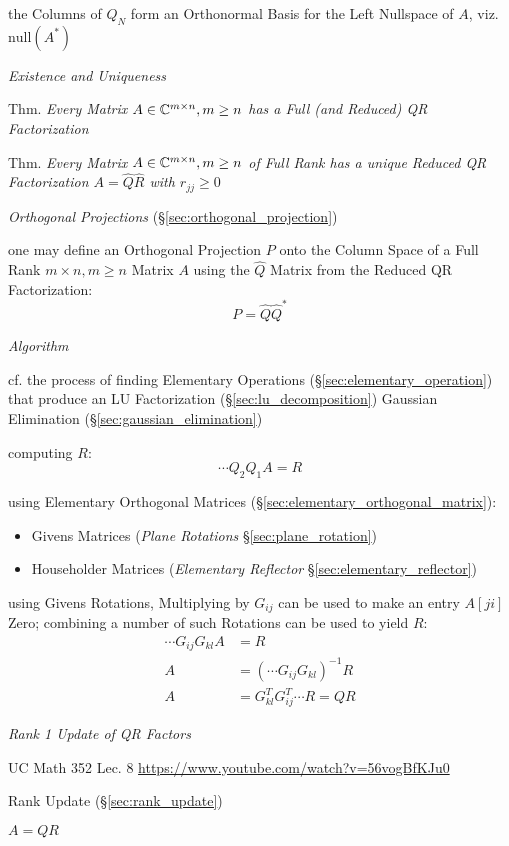 the Columns of $Q_N$ form an Orthonormal Basis for the Left Nullspace of $A$,
viz. $\mathrm{null}(A^*)$


\emph{Existence and Uniqueness}

Thm. \emph{Every Matrix $A \in \mathbb{C}^{m \times n}, m \geq n$ has a Full (and
  Reduced) QR Factorization}

Thm. \emph{Every Matrix $A \in \mathbb{C}^{m \times n}, m \geq n$ of Full Rank has
  a unique Reduced QR Factorization $A = \hat{Q}\hat{R}$ with $r_{jj} \geq 0$}


\emph{Orthogonal Projections} (\S\ref{sec:orthogonal_projection})

one may define an Orthogonal Projection $P$ onto the Column Space of a Full Rank
$m \times n, m \geq n$ Matrix $A$ using the $\hat{Q}$ Matrix from the Reduced
QR Factorization:
\[
  P = \hat{Q}\hat{Q}^*
\]


\emph{Algorithm}

cf. the process of finding Elementary Operations
(\S\ref{sec:elementary_operation}) that produce an LU Factorization
(\S\ref{sec:lu_decomposition}) \fist Gaussian Elimination
(\S\ref{sec:gaussian_elimination})

computing $R$:
\[
  \cdots Q_2 Q_1 A = R
\]

using Elementary Orthogonal Matrices (\S\ref{sec:elementary_orthogonal_matrix}):
\begin{itemize}
  \item Givens Matrices (\emph{Plane Rotations} \S\ref{sec:plane_rotation})
  \item Householder Matrices (\emph{Elementary Reflector}
    \S\ref{sec:elementary_reflector})
\end{itemize}

using Givens Rotations, Multiplying by $G_{ij}$ can be used to make an entry
$A[ji]$ Zero; combining a number of such Rotations can be used to yield $R$:
\begin{align*}
  \cdots G_{ij}G_{kl}A & = R \\
  A & = (\cdots G_{ij}G_{kl})^{-1}R \\
  A & = G_{kl}^T G_{ij}^T \cdots R = QR
\end{align*}


\emph{Rank 1 Update of QR Factors}

UC Math 352 Lec. 8 \url{https://www.youtube.com/watch?v=56vogBfKJu0}

Rank Update (\S\ref{sec:rank_update})

$A = QR$

